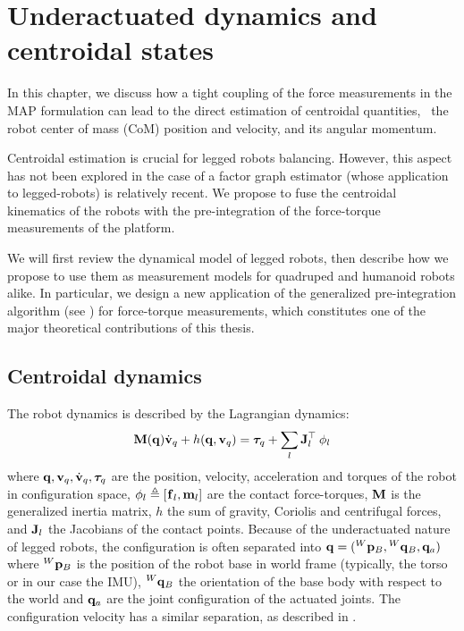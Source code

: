 \chapter{Underactuated dynamics and centroidal states}
\label{chp:underactuade_dynamics}
\minitoc
\bigskip

In this chapter, we discuss how a tight coupling of the force measurements in the MAP formulation can lead to the direct estimation
of centroidal quantities, \ie\ the robot center of mass (CoM) position and velocity, and its angular momentum.


Centroidal estimation is crucial for legged robots balancing. However, this aspect has not been explored in the case of a factor graph 
estimator (whose application to legged-robots) is relatively recent. We propose to fuse the centroidal kinematics of the robots with the pre-integration of the force-torque measurements 
of the platform.

We will first review the dynamical model of legged robots, then describe how we propose to use them as measurement models for quadruped and humanoid robots alike.
In particular, we design a new application of the generalized pre-integration algorithm (see ) for force-torque measurements, which constitutes
one of the major theoretical contributions of this thesis.


\section{Centroidal dynamics}
\label{sec:centroidal_dynamics}
The robot dynamics is described by the Lagrangian dynamics:
%
\begin{equation}\label{eq:wbdyn}
  {\bf M}({\bf q}) \dot{{\bf v}}_q + h({\bf q},{\bf v}_q) = \bm\tau_q + \sum_l {\bf J}_l^{\top} \prescript{}{}{\bf \phi}_{l}
\end{equation}
%
where ${\bf q},{\bf v}_q,\dot{{\bf v}}_q,\bm\tau_q$ are the position, velocity, acceleration and torques of the robot in configuration space,
$\prescript{}{}{\bf \phi}_{l} \triangleq [\prescript{}{}{{\bf f}}_{l},{\bf m}_l]$ are the contact force-torques,
${\bf M}$ is the generalized inertia matrix, $h$ the sum of gravity, Coriolis and centrifugal forces, and ${\bf J}_l$ the Jacobians of the contact points.
Because of the underactuated nature of legged robots, the configuration is often separated into ${\bf q}=(\prescript{W}{}{{\bf p}}_{B}, \prescript{W}{}{{\bf q}}_B ,{\bf q}_a)$ where $\prescript{W}{}{{\bf p}}_{B}$ 
is the position of the robot base in world frame (typically, the torso or in our case the IMU), $\prescript{W}{}{{\bf q}}_B$ the orientation of the base body with respect 
to the world and ${\bf q}_a$ are the joint configuration of the actuated joints. The configuration velocity has a similar separation, as described in .

